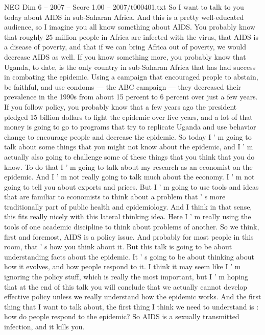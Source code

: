 \begin{textsample}{NEG Dim 6 – 2007 – Score 1.00 – 2007/t000401.txt}  \label{ex:f6_neg_061}
So I want to talk to you today about AIDS in sub-Saharan Africa.
And this is a pretty well-educated audience, so I imagine you all know something about AIDS.
You probably know that roughly 25 million people in Africa are infected with the virus, that AIDS is a disease of poverty, and that if we can bring Africa out of poverty, we would decrease AIDS as well.
If you know something more, you probably know that Uganda, to date, is the only country in sub-Saharan Africa that has had success in combating the epidemic.
Using a campaign that encouraged people to abstain, be faithful, and use condoms — the ABC campaign — they decreased their prevalence in the 1990s from about 15 percent to 6 percent over just a few years.
If you follow policy, you probably know that a few years ago the president pledged 15 billion dollars to fight the epidemic over five years, and a lot of that money is going to go to programs that try to replicate Uganda and use behavior change to encourage people and decrease the epidemic.
So today I ' m going to talk about some things that you might not know about the epidemic, and I ' m actually also going to challenge some of these things that you think that you do know.
To do that I ' m going to talk about my research as an economist on the epidemic.
And I ' m not really going to talk much about the economy.
I ' m not going to tell you about exports and prices.
But I ' m going to use tools and ideas that are familiar to economists to think about a problem that ' s more traditionally part of public health and epidemiology.
And I think in that sense, this fits really nicely with this lateral thinking idea.
Here I ' m really using the tools of one academic discipline to think about problems of another.
So we think, first and foremost, AIDS is a policy issue.
And probably for most people in this room, that ' s how you think about it.
But this talk is going to be about understanding facts about the epidemic.
It ' s going to be about thinking about how it evolves, and how people respond to it.
I think it may seem like I ' m ignoring the policy stuff, which is really the most important, but I ' m hoping that at the end of this talk you will conclude that we actually cannot develop effective policy unless we really understand how the epidemic works.
And the first thing that I want to talk about, the first thing I think we need to understand is : how do people respond to the epidemic?
So AIDS is a sexually transmitted infection, and it kills you.

\end{textsample}
